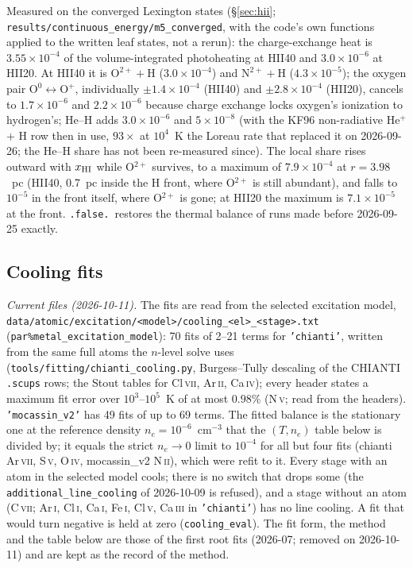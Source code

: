 \documentclass[english,a4paper]{my_memo}
\newcommand{\code}[1]{\texttt{#1}}
\begin{document}
Measured on the converged Lexington states (\S\ref{sec:hii};
\code{results/continuous\_energy/m5\_converged}, with the code's own
functions applied to the written leaf states, not a rerun): the
charge-exchange heat is $3.55{\times}10^{-4}$ of the volume-integrated
photoheating at HII40 and $3.0{\times}10^{-6}$ at HII20.  At HII40 it is
$\mathrm{O}^{2+} + \mathrm{H}$ ($3.0{\times}10^{-4}$) and
$\mathrm{N}^{2+} + \mathrm{H}$ ($4.3{\times}10^{-5}$); the oxygen pair
$\mathrm{O}^0 \leftrightarrow \mathrm{O}^+$, individually $\pm1.4\times10^{-4}$
(HII40) and $\pm2.8\times10^{-4}$ (HII20), cancels to $1.7\times10^{-6}$ and
$2.2\times10^{-6}$ because charge exchange locks oxygen's ionization to
hydrogen's; He--H adds $3.0{\times}10^{-6}$ and $5{\times}10^{-8}$ (with the
KF96 non-radiative He$^+$ + H row then in use, $93\times$ at $10^4$~K the Loreau rate that
replaced it on 2026-09-26; the He--H share has not been re-measured since).  The local
share rises outward with $x_{\rm HI}$ while O$^{2+}$ survives, to a maximum of
$7.9{\times}10^{-4}$ at $r = 3.98$~pc (HII40, 0.7~pc inside the H front, where O$^{2+}$ is still abundant), and
falls to $10^{-5}$ in the front itself, where O$^{2+}$ is gone; at HII20 the
maximum is $7.1{\times}10^{-5}$ at the front.
\code{.false.}\ restores the thermal balance of runs made before 2026-09-25
exactly.

\subsection{Cooling fits}
\label{sec:cool}
\emph{Current files (2026-10-11).}  The fits are read from the selected
excitation model, \code{data/\allowbreak atomic/\allowbreak excitation/\allowbreak <model>/\allowbreak cooling\_<el>\_<stage>.txt}
(\code{par\%metal\_excitation\_model}): 70 fits of 2--21 terms for
\code{'chianti'}, written from the same full atoms the $n$-level solve
uses (\code{tools/fitting/chianti\_cooling.py}, Burgess--Tully descaling of
the CHIANTI \code{.scups} rows; the Stout tables for Cl\,\textsc{vii},
Ar\,\textsc{ii}, Ca\,\textsc{iv}); every header states a maximum fit error
over $10^3$--$10^5$~K of at most $0.98\%$ (N\,\textsc{v}; read from the
headers).  \code{'mocassin\_v2'} has 49 fits of up to 69 terms.  The fitted
balance is the stationary one at the reference density $n_e =
10^{-6}$~cm$^{-3}$ that the $(T, n_e)$ table below is divided by; it equals
the strict $n_e \to 0$ limit to $10^{-4}$ for all but four fits (chianti
Ar\,\textsc{vii}, S\,\textsc{v}, O\,\textsc{iv}, mocassin\_v2
N\,\textsc{ii}), which were refit to it.  Every stage with an atom in the
selected model cools; there is no switch that drops some (the
\code{additional\_line\_cooling} of 2026-10-09 is refused), and a stage
without an atom (C\,\textsc{vii}; Ar\,\textsc{i}, Cl\,\textsc{i},
Ca\,\textsc{i}, Fe\,\textsc{i}, Cl\,\textsc{v}, Ca\,\textsc{iii} in
\code{'chianti'}) has no line cooling.  A fit that would turn negative is
held at zero (\code{cooling\_eval}).  The fit form, the method and the
table below are those of the first root fits (2026-07; removed on
2026-10-11) and are kept as the record of the method.
\end{document}
